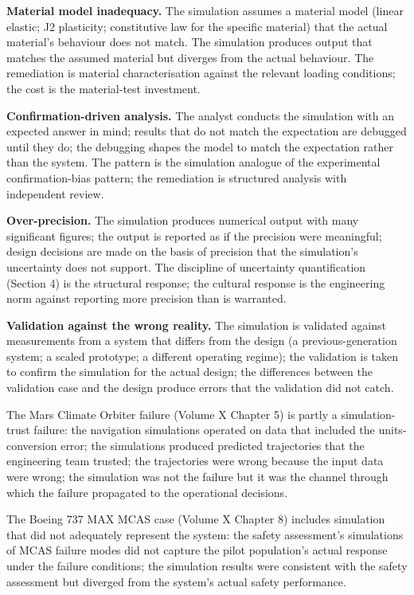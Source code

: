 \textbf{Material model inadequacy.} The simulation assumes a material model (linear elastic; J2 plasticity; constitutive law for the specific material) that the actual material's behaviour does not match. The simulation produces output that matches the assumed material but diverges from the actual behaviour. The remediation is material characterisation against the relevant loading conditions; the cost is the material-test investment.

\textbf{Confirmation-driven analysis.} The analyst conducts the simulation with an expected answer in mind; results that do not match the expectation are debugged until they do; the debugging shapes the model to match the expectation rather than the system. The pattern is the simulation analogue of the experimental confirmation-bias pattern; the remediation is structured analysis with independent review.

\textbf{Over-precision.} The simulation produces numerical output with many significant figures; the output is reported as if the precision were meaningful; design decisions are made on the basis of precision that the simulation's uncertainty does not support. The discipline of uncertainty quantification (Section 4) is the structural response; the cultural response is the engineering norm against reporting more precision than is warranted.

\textbf{Validation against the wrong reality.} The simulation is validated against measurements from a system that differs from the design (a previous-generation system; a scaled prototype; a different operating regime); the validation is taken to confirm the simulation for the actual design; the differences between the validation case and the design produce errors that the validation did not catch.

The Mars Climate Orbiter failure (Volume X Chapter 5) is partly a simulation-trust failure: the navigation simulations operated on data that included the units-conversion error; the simulations produced predicted trajectories that the engineering team trusted; the trajectories were wrong because the input data were wrong; the simulation was not the failure but it was the channel through which the failure propagated to the operational decisions.

The Boeing 737 MAX MCAS case (Volume X Chapter 8) includes simulation that did not adequately represent the system: the safety assessment's simulations of MCAS failure modes did not capture the pilot population's actual response under the failure conditions; the simulation results were consistent with the safety assessment but diverged from the system's actual safety performance.


